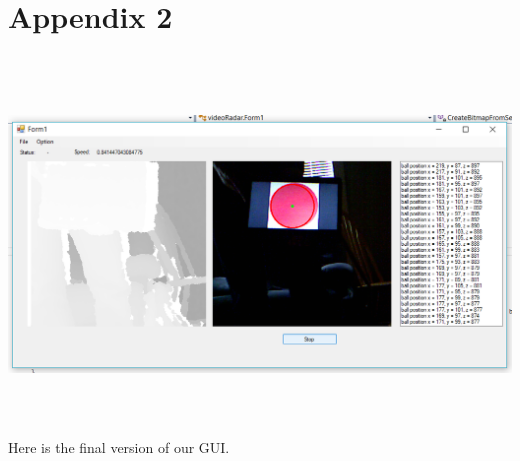 \documentclass[onecolumn, draftclsnofoot,10pt, compsoc]{IEEEtran}
\begin{document}
\section{Appendix 2}


\includegraphics[height=10cm]{projectgui.png}
Here is the final version of our GUI.
\end{document}
